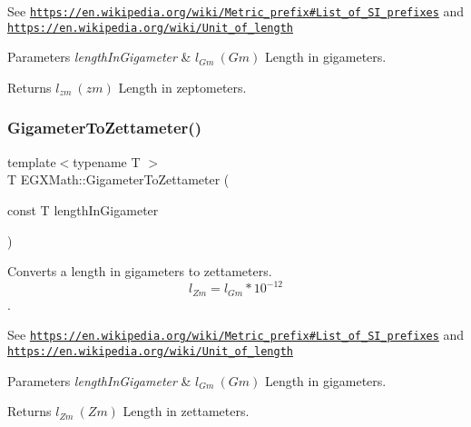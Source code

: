 See \href{https://en.wikipedia.org/wiki/Metric_prefix#List_of_SI_prefixes}{\tt https\+://en.\+wikipedia.\+org/wiki/\+Metric\+\_\+prefix\#\+List\+\_\+of\+\_\+\+S\+I\+\_\+prefixes} and \href{https://en.wikipedia.org/wiki/Unit_of_length}{\tt https\+://en.\+wikipedia.\+org/wiki/\+Unit\+\_\+of\+\_\+length} 
\begin{DoxyParams}{Parameters}
{\em length\+In\+Gigameter} & $ l_{Gm}\ (Gm)$ Length in gigameters. \\
\hline
\end{DoxyParams}
\begin{DoxyReturn}{Returns}
$ l_{zm}\ (zm)$ Length in zeptometers. 
\end{DoxyReturn}
\mbox{\label{group___e_g_x_math-_conversions-_length_conversions-_s_i-_gigameter-_s_i_gaaaefaf67b876bfdeccd8176508e765e3}} 
\subsubsection{\texorpdfstring{Gigameter\+To\+Zettameter()}{GigameterToZettameter()}}
{\footnotesize\ttfamily template$<$typename T $>$ \\
T E\+G\+X\+Math\+::\+Gigameter\+To\+Zettameter (\begin{DoxyParamCaption}\item[{const T}]{length\+In\+Gigameter }\end{DoxyParamCaption})}



Converts a length in gigameters to zettameters. \[ l_{Zm}=l_{Gm} * 10^{-12} \]. 

See \href{https://en.wikipedia.org/wiki/Metric_prefix#List_of_SI_prefixes}{\tt https\+://en.\+wikipedia.\+org/wiki/\+Metric\+\_\+prefix\#\+List\+\_\+of\+\_\+\+S\+I\+\_\+prefixes} and \href{https://en.wikipedia.org/wiki/Unit_of_length}{\tt https\+://en.\+wikipedia.\+org/wiki/\+Unit\+\_\+of\+\_\+length} 
\begin{DoxyParams}{Parameters}
{\em length\+In\+Gigameter} & $ l_{Gm}\ (Gm)$ Length in gigameters. \\
\hline
\end{DoxyParams}
\begin{DoxyReturn}{Returns}
$ l_{Zm}\ (Zm)$ Length in zettameters. 
\end{DoxyReturn}
